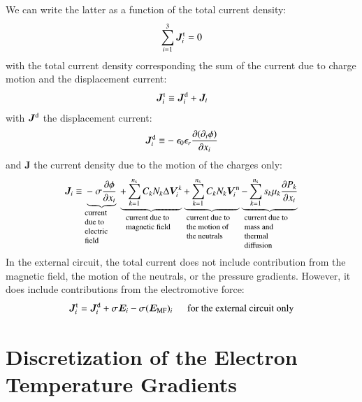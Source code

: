 \documentclass{warpdoc}
\newcommand{\ns}{{n_{\rm s}}}
\renewcommand{\vec}[1]{\bm{#1}}
\begin{document}
%
We can write the latter as a function of the total current density:
%
\begin{equation}
\sum_{i=1}^3 \vec{J}_i^{\rm t} =0
\end{equation}
%
with the total current density corresponding the sum of the current due to charge motion and the displacement current:
%
\begin{equation}
 \vec{J}_i^{\rm t} \equiv 
  \vec{J}_i^{\rm d}
+\vec{J}_i
\label{eqn:Jtotal}
\end{equation}
%
with $\vec{J}^{\rm d}$ the displacement current:
%
\begin{equation}
 \vec{J}_i^{\rm d} \equiv 
  -~\epsilon_0 \epsilon_r \frac{\partial (\partial_t \phi)}{\partial x_i}
\label{eqn:Jdisplacement}
\end{equation}
%
and $\vec{J}$ the current density due to the motion of the charges only:
%
\begin{equation}
 \vec{J}_i \equiv 
  \underbrace{-~\sigma\frac{\partial \phi}{\partial x_i}}_{\begin{minipage}{0.1\textwidth}\footnotesize\flushleft current due to electric field \end{minipage}}
\underbrace{+ \sum_{k=1}^\ns C_k N_k \Delta \vec{V}^k_i}_{\begin{minipage}{0.15\textwidth}\footnotesize\flushleft current due to magnetic field \end{minipage}}
\underbrace{+ \sum_{k=1}^\ns C_k N_k \vec{V}^{\rm n}_i}_{\begin{minipage}{0.15\textwidth}\footnotesize\flushleft current due to the motion of the neutrals \end{minipage}}
\underbrace{- \sum_{k=1}^\ns {s_k \mu_k} \frac{\partial P_k}{\partial x_i} }_{\begin{minipage}{0.15\textwidth}\footnotesize\flushleft current due to mass and thermal diffusion \end{minipage}}
\label{eqn:Jcomponents}
\end{equation}
%
In the external circuit, the total current does not include contribution from the magnetic field, the motion of the neutrals, or the pressure gradients. However, it does include  contributions from the electromotive force:
%
\begin{equation}
 \vec{J}_i^{\rm t} =
  \vec{J}_i^{\rm d}
+ \sigma \vec{E}_i
- \sigma (\vec{E}_{\rm MF})_i ~~~~~~\textrm{for the external circuit only}
\end{equation}
%


\section{Discretization of the Electron Temperature Gradients}
\end{document}
